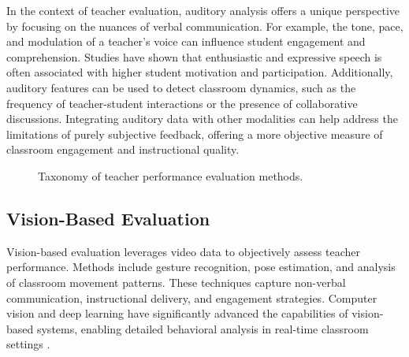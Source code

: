 In the context of teacher evaluation, auditory analysis offers a unique perspective by focusing on the nuances of verbal communication. For example, the tone, pace, and modulation of a teacher's voice can influence student engagement and comprehension. Studies have shown that enthusiastic and expressive speech is often associated with higher student motivation and participation. Additionally, auditory features can be used to detect classroom dynamics, such as the frequency of teacher-student interactions or the presence of collaborative discussions. Integrating auditory data with other modalities can help address the limitations of purely subjective feedback, offering a more objective measure of classroom engagement and instructional quality.

\begin{figure}[t]
    \centering
    \centering
    \caption{Taxonomy of teacher performance evaluation methods.}
    \label{fig:taxonomy}
\end{figure}


\subsection{Vision-Based Evaluation}
Vision-based evaluation leverages video data to objectively assess teacher performance. Methods include gesture recognition, pose estimation, and analysis of classroom movement patterns. These techniques capture non-verbal communication, instructional delivery, and engagement strategies. Computer vision and deep learning have significantly advanced the capabilities of vision-based systems, enabling detailed behavioral analysis in real-time classroom settings \cite{10.1007/978-981-99-9109-9_7, hou2024encouragement, Lin2021, AFSAR20156935, 10050049, YE2023108915}.

